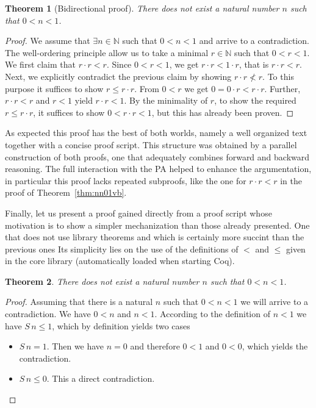 \documentclass[11pt,letterpaper]{article}
\newtheorem{theorem}{Theorem}
\begin{document}
\begin{theorem}[Bidirectional proof]\label{thm:nn01vbi}
  There does not exist a natural number $n$ such that $0<n<1$.
\end{theorem}
\begin{proof}
  We assume that $\exists n\in\mathbb{N}$ such that $0<n<1$ and arrive to a 
contradiction.
  The well-ordering principle allow us to take a minimal $r\in\mathbb{N}$ such 
  that $0<r<1$. We first claim that $r\cdot r<r$. 
  Since  $0<r<1$, we get $r\cdot r<1\cdot r$, that is $r\cdot r<r$.
  Next, we explicitly contradict the previous claim by showing 
  $r\cdot r\not < r$. 
  To this purpose it suffices to show $r\leq r\cdot r$. From $0<r$ we get 
  $0=0\cdot r<r\cdot r$. Further, $r\cdot r<r$ and $r<1$ yield $r\cdot r<1$. 
  By the minimality of $r$, to show the required $r\leq r\cdot r$, it suffices 
  to show $0<r\cdot r<1$, but this has already been proven. 
\end{proof}


As expected this proof has the best of both worlds, namely a well organized 
text together with a concise proof script. This structure was obtained by a 
parallel construction of both proofs, one that adequately combines forward and 
backward reasoning. The full interaction with the PA helped to enhance the 
argumentation, in particular this proof lacks repeated subproofs, 
like the one for $r\cdot r<r$ in the proof of Theorem~\ref{thm:nn01vb}.


Finally, let us present a proof gained directly from a proof script whose motivation is to 
show a simpler mechanization than those already presented. One that does not 
use library theorems and which is certainly more succint than the previous ones 
Its simplicity lies on the use of the definitions of $<$ and $\leq$ 
given in the core library (automatically loaded when starting Coq). 


\begin{theorem}\label{thm:nn01vauto}
  There does not exist a natural number $n$ such that $0<n<1$.
\end{theorem}
\begin{proof}
  Assuming that there is a natural $n$ such that $0<n<1$ we will arrive to a contradiction. We have
  $0<n$ and $n<1$. According to the definition of $n<1$ we have $S\,n\leq 1$, which by definition yields two cases
  \begin{itemize}
  \item $S\,n=1$. Then we have $n=0$ and therefore $0<1$ and $0<0$, which yields the contradiction.
  \item $S\,n\leq 0$. This a direct contradiction.
  \end{itemize}
\end{proof}
\end{document}
